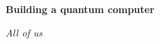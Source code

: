 \documentclass[a4paper]{article}
\begin{document}
\begin{center}
    \Huge \textbf{Building a quantum computer}
\end{center}
\vspace{-1.5em}

\begin{center}
    \emph{\large All of us}
\end{center}
\vspace{0.5em}








\printbibliography
\end{document}
